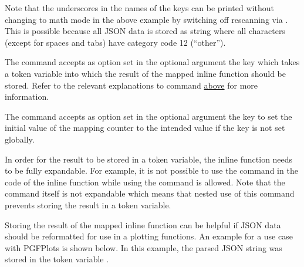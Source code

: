 \documentclass[a4paper]{article}
\begin{document}
{{Note that the underscores in the names of the keys can be printed without changing to math mode in the above example by switching off rescanning via . This is possible because all JSON data is stored as string where all characters (except for spaces and tabs) have category code 12 (``other'').

The command \macro{\JSONParseArrayMapInline} accepts as option set in the optional argument the key  which takes a token variable into which the result of the mapped inline function should be stored. Refer to the relevant explanations to command \macro{\JSONParseArrayUse} \hyperlink{macro:arrayuse}{above} for more information.

The command \macro{\JSONParseArrayMapInline} accepts as option set in the optional argument the key  to set the initial value of the mapping counter to the intended value if the key  is not set globally.

\warning In order for the result to be stored in a token variable, the inline function needs to be fully expandable. For example, it is not possible to use the command \macro{\JSONParseValue} in the code of the inline function while using the command \macro{\JSONParseExpandableValue} is allowed. Note that the command \macro{\JSONParseArrayMapInline} itself is not expandable which means that nested use of this command prevents storing the result in a token variable.

Storing the result of the mapped inline function can be helpful if JSON data should be reformatted for use in a plotting functions. An example for a use case with PGFPlots is shown below. In this example, the parsed JSON string  was stored in the token variable \macro{\myJSONplotdata}.

\pgfplotsset{width=5.25cm}

\begin{codeexamplecolumns}

\end{codeexamplecolumns}

}}
\end{document}
